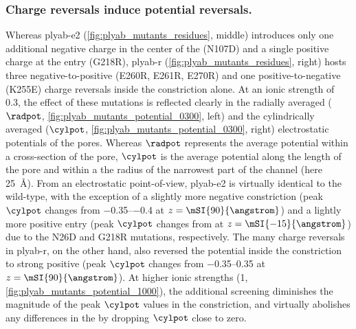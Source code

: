 \subsubsection{Charge reversals induce potential reversals.}
%
Whereas \gls{plyab-e2} (\cref{fig:plyab_mutants_residues}, middle) introduces only one additional negative
charge in the center of the \transi{} \lumen{} (N107D) and a single positive charge at the \transi{} entry
(G218R), \gls{plyab-r} (\cref{fig:plyab_mutants_residues}, right) hosts three negative-to-positive (E260R,
E261R, E270R) and one positive-to-negative (K255E) charge reversals inside the \cisi{} constriction alone. At
an ionic strength of \SI{0.3}{\Molar}, the effect of these mutations is reflected clearly in the radially
averaged ($\radpot$, \cref{fig:plyab_mutants_potential_0300}, left) and the cylindrically averaged ($\cylpot$,
\cref{fig:plyab_mutants_potential_0300}, right) electrostatic potentials of the pores. Whereas $\radpot$
represents the average potential within a cross-section of the pore, $\cylpot$ is the average potential along
the length of the pore and within a the radius of the narrowest part of the channel (here \SI{25}{\angstrom}).
From an electrostatic point-of-view, \gls{plyab-e2} is virtually identical to the wild-type, with the
exception of a slightly more negative constriction (peak $\cylpot$ changes from \SIrange{-0.35}{-0.4}{\kTe} at
$z = \mSI{90}{\angstrom}$) and a lightly more positive \transi{} entry (peak $\cylpot$ changes from
 at $z = \mSI{-15}{\angstrom}$) due to the N26D and G218R mutations, respectively.
The many charge reversals in \gls{plyab-r}, on the other hand, also reversed the potential inside the
constriction to strong positive (peak $\cylpot$ changes from \SIrange{-0.35}{+0.35}{\kTe} at $z =
\mSI{90}{\angstrom}$). At higher ionic strengths (\SI{1}{\Molar}, \cref{fig:plyab_mutants_potential_1000}),
the additional screening diminishes the magnitude of the peak $\cylpot$ values in the constriction, and
virtually abolishes any differences in the \transi{} \lumen{} by dropping $\cylpot$ close to zero.


